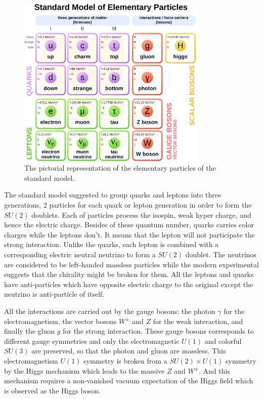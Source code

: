 \begin{figure}[ht]
  \begin{center}
    \includegraphics[width=0.8\textwidth]{figures/introduction/standard_model.pdf}
  \end{center}
  \caption{The pictorial representation of the elementary particles of the standard model.}
  \label{fig:standard_model_elementary_particles}
\end{figure}

The standard model suggested to group quarks and leptons into three generations, 2 particles for each quark or lepton generation in order to form the $SU(2)$ doublets. Each of particles process the isospin, weak hyper charge, and hence the electric charge. Besides of these quantum number, quarks carries color charges while the leptons don't. It means that the lepton will not participate the strong interaction. Unlike the quarks, each lepton is combined with a corresponding electric neutral neutrino to form a $SU(2)$ doublet. The neutrinos are considered to be left-handed massless particles while the modern experimental suggests that the chirality might be broken for them. All the leptons and quarks have anti-particles which have opposite electric charge to the original except the neutrino is anti-particle of itself. 

All the interactions are carried out by the gauge bosons: the photon $\gamma$ for the electromagnetism, the vector bosons $W^\pm$ and $Z$ for the weak interaction, and finally the gluon $g$ for the strong interaction. These gauge bosons corresponds to different gauge symmetries and only the electromagnetic $U(1)$ and colorful $SU(3)$ are preserved, so that the photon and gluon are massless. This electromagnetism $U(1)$ symmetry is broken from a $SU(2)\times U(1)$ symmetry by the Higgs mechanism which leads to the massive $Z$ and $W^\pm$. And this mechanism requires a non-vanished vacuum expectation of the Higgs field which is observed as the Higgs boson. 

